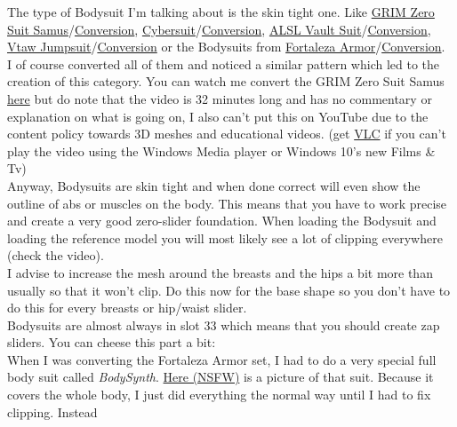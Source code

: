 The type of Bodysuit I'm talking about is the skin tight one. Like 
\href{https://www.nexusmods.com/fallout4/mods/40294}{GRIM Zero Suit Samus}/\href{https://www.nexusmods.com/fallout4/mods/40451}{Conversion},
\href{https://www.nexusmods.com/fallout4/mods/39558}{Cybersuit}/\href{https://www.nexusmods.com/fallout4/mods/39626}{Conversion},
\href{https://www.nexusmods.com/fallout4/mods/29197}{ALSL Vault Suit}/\href{https://www.nexusmods.com/fallout4/mods/40145}{Conversion},
\href{https://www.nexusmods.com/fallout4/mods/40076}{Vtaw Jumpsuit}/\href{https://www.nexusmods.com/fallout4/mods/40081}{Conversion} or
the Bodysuits from \href{https://www.nexusmods.com/fallout4/mods/10692}{Fortaleza Armor}/\href{https://www.nexusmods.com/fallout4/mods/40340}{Conversion}.\\
I of course converted all of them and noticed a similar pattern which led to the creation of this category. You can watch me convert 
the GRIM Zero Suit Samus \href{https://drive.google.com/uc?export=download&id=1d1wpIcoKJtXW9bLDDj4uzsJYj38uRZ3H}{here} but do note 
that the video is 32 minutes long and has no commentary or explanation on what is going on, I also can't put this on YouTube due to 
the content policy towards 3D meshes and educational videos. (get \href{https://www.videolan.org/vlc/}{VLC} if you can't play the 
video using the Windows Media player or Windows 10's new Films \& Tv)\\
Anyway, Bodysuits are skin tight and when done correct will even show the outline of abs or muscles on the body. This means that you 
have to work precise and create a very good zero-slider foundation. When loading the Bodysuit and loading the reference model you will 
most likely see a lot of clipping everywhere (check the video).\\
I advise to increase the mesh around the breasts and the hips a bit more 
than usually so that it won't clip. Do this now for the base shape so you don't have to do this for every breasts or hip/waist slider.\\
Bodysuits are almost always in slot 33 which means that you should create zap sliders. You can cheese this part a bit:\\ When I was converting 
the Fortaleza Armor set, I had to do a very special full body suit called \textit{BodySynth}. \href{http://www.fembotwiki.com/images/thumb/8/89/Fallout_4_Fortaleza_Armor_Synth_Suit_1.jpg/800px-Fallout_4_Fortaleza_Armor_Synth_Suit_1.jpg}{Here (NSFW)}
is a picture of that suit. Because it covers the whole body, I just did everything the normal way until I had to fix clipping. Instead 
